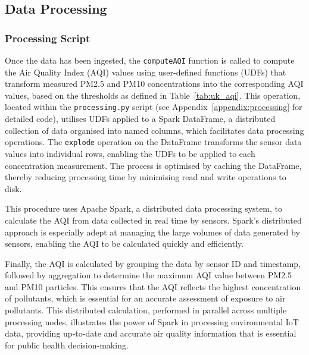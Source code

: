 \documentclass[12pt,oneside]{book} %
\begin{document}
\subsection{Data Processing}

\subsubsection{Processing Script}
Once the data has been ingested, the \texttt{computeAQI} function is called to
compute the Air Quality Index (AQI) values using user-defined functions (UDFs)
that transform measured PM2.5 and PM10 concentrations into the corresponding
AQI values, based on the thresholds as defined in Table~\ref{tab:uk_aqi}. This
operation, located within the \texttt{processing.py} script (see
Appendix~\ref{appendix:processing} for detailed code), utilises UDFs applied to
a Spark DataFrame, a distributed collection of data organised into named
columns, which facilitates data processing operations. The \texttt{explode}
operation on the DataFrame transforms the sensor data values into individual
rows, enabling the UDFs to be applied to each concentration measurement. The
process is optimised by caching the DataFrame, thereby reducing processing time
by minimising read and write operations to disk.

This procedure uses Apache Spark, a distributed data processing system, to
calculate the AQI from data collected in real time by sensors. Spark's
distributed approach is especially adept at managing the large volumes of data
generated by sensors, enabling the AQI to be calculated quickly and
efficiently.

Finally, the AQI is calculated by grouping the data by sensor ID and timestamp,
followed by aggregation to determine the maximum AQI value between PM2.5 and
PM10 particles. This ensures that the AQI reflects the highest concentration of
pollutants, which is essential for an accurate assessment of exposure to air
pollutants. This distributed calculation, performed in parallel across multiple
processing nodes, illustrates the power of Spark in processing environmental
IoT data, providing up-to-date and accurate air quality information that is
essential for public health decision-making.
\end{document}
